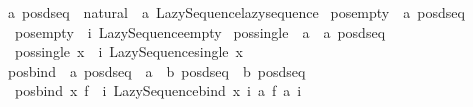 \begin{isabellebody}
\ {\isacharprime}{\kern0pt}a\ pos{\isacharunderscore}{\kern0pt}dseq\ {\isacharequal}{\kern0pt}\ {\isachardoublequoteopen}natural\ {\isasymRightarrow}\ {\isacharprime}{\kern0pt}a\ Lazy{\isacharunderscore}{\kern0pt}Sequence{\isachardot}{\kern0pt}lazy{\isacharunderscore}{\kern0pt}sequence{\isachardoublequoteclose}\isanewline
\isanewline
{}\isamarkupfalse%
\ pos{\isacharunderscore}{\kern0pt}empty\ {\isacharcolon}{\kern0pt}{\isacharcolon}{\kern0pt}\ {\isachardoublequoteopen}{\isacharprime}{\kern0pt}a\ pos{\isacharunderscore}{\kern0pt}dseq{\isachardoublequoteclose}\isanewline
{}\isanewline
\ \ {\isachardoublequoteopen}pos{\isacharunderscore}{\kern0pt}empty\ {\isacharequal}{\kern0pt}\ {\isacharparenleft}{\kern0pt}{\isasymlambda}i{\isachardot}{\kern0pt}\ Lazy{\isacharunderscore}{\kern0pt}Sequence{\isachardot}{\kern0pt}empty{\isacharparenright}{\kern0pt}{\isachardoublequoteclose}\isanewline
\isanewline
{}\isamarkupfalse%
\ pos{\isacharunderscore}{\kern0pt}single\ {\isacharcolon}{\kern0pt}{\isacharcolon}{\kern0pt}\ {\isachardoublequoteopen}{\isacharprime}{\kern0pt}a\ {\isasymRightarrow}\ {\isacharprime}{\kern0pt}a\ pos{\isacharunderscore}{\kern0pt}dseq{\isachardoublequoteclose}\isanewline
{}\isanewline
\ \ {\isachardoublequoteopen}pos{\isacharunderscore}{\kern0pt}single\ x\ {\isacharequal}{\kern0pt}\ {\isacharparenleft}{\kern0pt}{\isasymlambda}i{\isachardot}{\kern0pt}\ Lazy{\isacharunderscore}{\kern0pt}Sequence{\isachardot}{\kern0pt}single\ x{\isacharparenright}{\kern0pt}{\isachardoublequoteclose}\isanewline
\isanewline
{}\isamarkupfalse%
\ pos{\isacharunderscore}{\kern0pt}bind\ {\isacharcolon}{\kern0pt}{\isacharcolon}{\kern0pt}\ {\isachardoublequoteopen}{\isacharprime}{\kern0pt}a\ pos{\isacharunderscore}{\kern0pt}dseq\ {\isasymRightarrow}\ {\isacharparenleft}{\kern0pt}{\isacharprime}{\kern0pt}a\ {\isasymRightarrow}\ {\isacharprime}{\kern0pt}b\ pos{\isacharunderscore}{\kern0pt}dseq{\isacharparenright}{\kern0pt}\ {\isasymRightarrow}\ {\isacharprime}{\kern0pt}b\ pos{\isacharunderscore}{\kern0pt}dseq{\isachardoublequoteclose}\isanewline
{}\isanewline
\ \ {\isachardoublequoteopen}pos{\isacharunderscore}{\kern0pt}bind\ x\ f\ {\isacharequal}{\kern0pt}\ {\isacharparenleft}{\kern0pt}{\isasymlambda}i{\isachardot}{\kern0pt}\ Lazy{\isacharunderscore}{\kern0pt}Sequence{\isachardot}{\kern0pt}bind\ {\isacharparenleft}{\kern0pt}x\ i{\isacharparenright}{\kern0pt}\ {\isacharparenleft}{\kern0pt}{\isasymlambda}a{\isachardot}{\kern0pt}\ f\ a\ i{\isacharparenright}{\kern0pt}{\isacharparenright}{\kern0pt}{\isachardoublequoteclose}\isanewline

\end{isabellebody}
